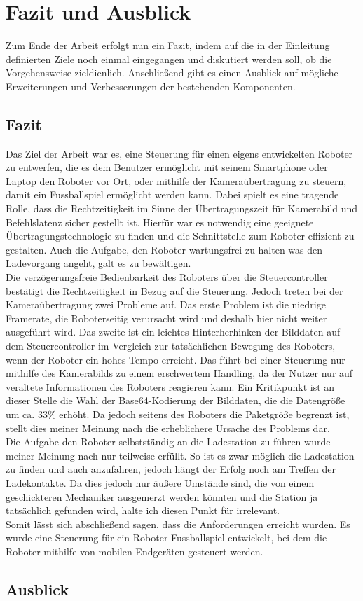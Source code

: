 \chapter{Fazit und Ausblick}
\label{ch:fazit}

Zum Ende der Arbeit erfolgt nun ein Fazit, indem auf die in der Einleitung definierten Ziele noch einmal eingegangen und diskutiert werden soll, ob die Vorgehensweise zieldienlich. Anschließend gibt es einen Ausblick auf mögliche Erweiterungen und Verbesserungen der bestehenden Komponenten.

\section{Fazit}
Das Ziel der Arbeit war es, eine Steuerung für einen eigens entwickelten Roboter zu entwerfen, die es dem Benutzer ermöglicht mit seinem Smartphone oder Laptop den Roboter vor Ort, oder mithilfe der Kameraübertragung zu steuern, damit ein Fussballspiel ermöglicht werden kann. Dabei spielt es eine tragende Rolle, dass die Rechtzeitigkeit im Sinne der Übertragungszeit für Kamerabild und Befehlslatenz sicher gestellt ist. Hierfür war es notwendig eine geeignete Übertragungstechnologie zu finden und die Schnittstelle zum Roboter effizient zu gestalten. Auch die Aufgabe, den Roboter wartungsfrei zu halten was den Ladevorgang angeht, galt es zu bewältigen. \\
Die verzögerungsfreie Bedienbarkeit des Roboters über die Steuercontroller bestätigt die Rechtzeitigkeit in Bezug auf die Steuerung. Jedoch treten bei der Kameraübertragung zwei Probleme auf. Das erste Problem ist die niedrige Framerate, die Roboterseitig verursacht wird und deshalb hier nicht weiter ausgeführt wird. Das zweite ist ein leichtes Hinterherhinken der Bilddaten auf dem Steuercontroller im Vergleich zur tatsächlichen Bewegung des Roboters, wenn der Roboter ein hohes Tempo erreicht. Das führt bei einer Steuerung nur mithilfe des Kamerabilds zu einem erschwertem Handling, da der Nutzer nur auf veraltete Informationen des Roboters reagieren kann. Ein Kritikpunkt ist an dieser Stelle die Wahl der Base64-Kodierung der Bilddaten, die die Datengröße um ca. 33\% erhöht. Da jedoch seitens des Roboters die Paketgröße begrenzt ist, stellt dies meiner Meinung nach die erheblichere Ursache des Problems dar. \\
Die Aufgabe den Roboter selbstständig an die Ladestation zu führen wurde meiner Meinung nach nur teilweise erfüllt. So ist es zwar möglich die Ladestation zu finden und auch anzufahren, jedoch hängt der Erfolg noch am Treffen der Ladekontakte. Da dies jedoch nur äußere Umstände sind, die von einem geschickteren Mechaniker ausgemerzt werden könnten und die Station ja tatsächlich gefunden wird, halte ich diesen Punkt für irrelevant. \\
Somit lässt sich abschließend sagen, dass die Anforderungen erreicht wurden. Es wurde eine Steuerung für ein Roboter Fussballspiel entwickelt, bei dem die Roboter mithilfe von mobilen Endgeräten gesteuert werden.





\section{Ausblick}